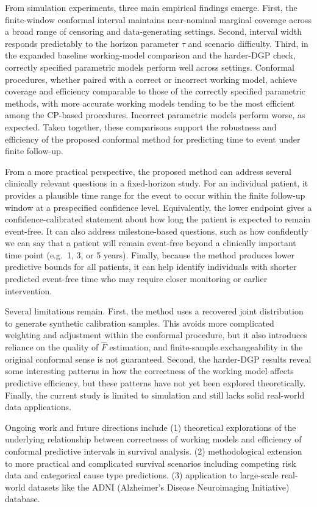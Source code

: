 \documentclass[12pt]{article}
\newcommand{\addchaptertoc}[1]{\addcontentsline{toc}{section}{#1}}
\newcommand{\addchaptertoc}[1]{\addcontentsline{toc}{chapter}{#1}}
\begin{document}
From simulation experiments, three main empirical findings emerge.
First, the finite-window conformal interval maintains near-nominal marginal coverage across a broad range of censoring and data-generating settings.
Second, interval width responds predictably to the horizon parameter $\tau$ and scenario difficulty.
Third, in the expanded baseline working-model comparison and the harder-DGP check, correctly specified parametric models perform well across settings. Conformal procedures, whether paired with a correct or incorrect working model, achieve coverage and efficiency comparable to those of the correctly specified parametric methods, with more accurate working models tending to be the most efficient among the CP-based procedures. Incorrect parametric models perform worse, as expected. Taken together, these comparisons support the robustness and efficiency of the proposed conformal method for predicting time to event under finite follow-up.

From a more practical perspective, the proposed method can address several clinically relevant questions in a fixed-horizon study. For an individual patient, it provides a plausible time range for the event to occur within the finite follow-up window at a prespecified confidence level. Equivalently, the lower endpoint gives a confidence-calibrated statement about how long the patient is expected to remain event-free. It can also address milestone-based questions, such as how confidently we can say that a patient will remain event-free beyond a clinically important time point (e.g.\ 1, 3, or 5 years). Finally, because the method produces lower predictive bounds for all patients, it can help identify individuals with shorter predicted event-free time who may require closer monitoring or earlier intervention.

Several limitations remain. First, the method uses a recovered joint distribution to generate synthetic calibration samples. This avoids more complicated weighting and adjustment within the conformal procedure, but it also introduces reliance on the quality of $\hat F$ estimation, and finite-sample exchangeability in the original conformal sense is not guaranteed. Second, the harder-DGP results reveal some interesting patterns in how the correctness of the working model affects predictive efficiency, but these patterns have not yet been explored theoretically. Finally, the current study is limited to simulation and still lacks solid real-world data applications. 

Ongoing work and future directions include (1) theoretical explorations of the underlying relationship between correctness of working models and efficiency of conformal predictive intervals in survival analysis. (2) methodological extension to more practical and complicated survival scenarios including competing risk data and categorical cause type predictions. (3) application to large-scale real-world datasets like the ADNI (Alzheimer’s Disease Neuroimaging Initiative) database.


\clearpage
\addchaptertoc{References}


\normalsize
\nonfrenchspacing
\doublespacing
\setlength{\parindent}{15pt}
\setlength{\parskip}{3pt}
\end{document}

